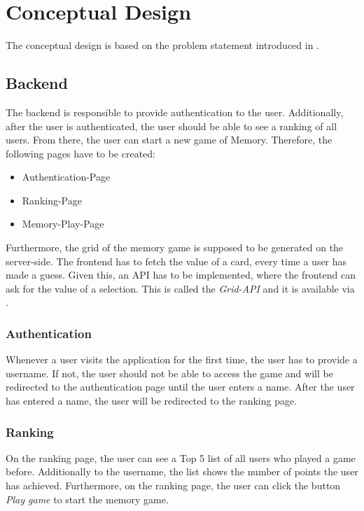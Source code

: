\section{Conceptual Design}\label{sec:02_design}
The conceptual design is based on the problem statement introduced in .


\subsection{Backend}\label{subsec:02_design_backend}
The backend is responsible to provide authentication to the user. Additionally, after the user is authenticated, the user should be able to see a ranking of all users. From there, the user can start a new game of Memory.
Therefore, the following pages have to be created:
\begin{itemize}
\item Authentication-Page 
\item Ranking-Page 
\item Memory-Play-Page 
\end{itemize}
Furthermore, the grid of the memory game is supposed to be generated on the server-side. The frontend has to fetch the value of a card, every time a user has made a guess. Given this, an API has to be implemented, where the frontend can ask for the value of a selection. This is called the \textit{Grid-API} and it is available via .

\subsubsection{Authentication}\label{subsubsec:02_design_backend_auth}
Whenever a user visits the application for the first time, the user has to provide a username. If not, the user should not be able to access the game and will be redirected to the authentication page until the user enters a name.
After the user has entered a name, the user will be redirected to the ranking page.

\subsubsection{Ranking}\label{subsubsec:02_design_backend_ranking}
On the ranking page, the user can see a Top 5 list of all users who played a game before. Additionally to the username, the list shows the number of points the user has achieved.
Furthermore, on the ranking page, the user can click the button \textit{Play game} to start the memory game.

